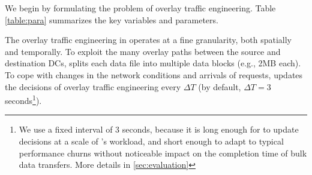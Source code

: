 \begin{table}[t]
\begin{center}
\end{center}
\vspace{-0.4cm}
\label{table:para}
\end{table}

We begin by formulating the problem of overlay traffic engineering.
Table \ref{table:para} summarizes the key variables and parameters.

The overlay traffic engineering in \name operates at a
fine granularity, both spatially and temporally. To exploit the many
overlay paths between the source and destination DCs, \name splits
each data file into multiple data blocks (e.g., 2MB each).
To cope with changes in the network conditions and arrivals of requests,
\name updates the decisions of overlay traffic engineering every
$\Delta T$ (by default, $\Delta T=3$ seconds\footnote{We use a fixed interval of
3 seconds, because it is long enough for \name to update decisions at
a scale of \company's workload, and short enough to adapt to typical
performance churns without noticeable impact on the completion time
of bulk data transfers.
More details in \Section\ref{sec:evaluation}}).



